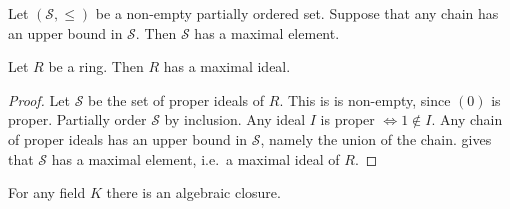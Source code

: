 \documentclass{article}
\begin{document}
\begin{nlemma}\label{lem:zorn}
    Let $(\mathcal{S},\leq)$ be a non-empty partially ordered set.
    Suppose that any chain has an upper bound in $\mathcal{S}$.
    Then $\mathcal{S}$ has a maximal element.
\end{nlemma}
\begin{nlemma}\label{lem:5.6}
    Let $R$ be a ring. Then $R$ has a maximal ideal.
\end{nlemma}
\begin{proof}
    Let $\mathcal{S}$ be the set of proper ideals of $R$.
    This is is non-empty, since $(0)$ is proper.
    Partially order $\mathcal{S}$ by inclusion.
    Any ideal $I$ is proper $\Longleftrightarrow 1 \notin I$.
    Any chain of proper ideals has an upper bound in $\mathcal{S}$, namely the union of the chain.
     gives that $\mathcal{S}$ has a maximal element, i.e.\ a maximal ideal of $R$.
\end{proof}
\begin{nthm}\label{thm:5.7}
    For any field $K$ there is an algebraic closure.
\end{nthm}
\end{document}
